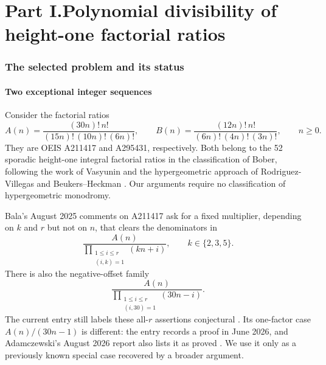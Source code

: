 \documentclass[11pt]{article}
\theoremstyle{definition}
\theoremstyle{remark}
\begin{document}
\begingroup
\small
\setlength{\parskip}{0pt}
\tableofcontents
\endgroup
\newpage

\part*{Part I.\quad Polynomial divisibility of height-one factorial ratios}

\section{The selected problem and its status}
\subsection{Two exceptional integer sequences}
Consider the factorial ratios
\begin{equation}\label{eq:AB}
 A(n)=\frac{(30n)!\,n!}{(15n)!\,(10n)!\,(6n)!},
 \qquad
 B(n)=\frac{(12n)!\,n!}{(6n)!\,(4n)!\,(3n)!},\qquad n\geq0.
\end{equation}
They are OEIS A211417 and A295431, respectively. Both belong to the
52 sporadic height-one integral factorial ratios in the classification
of Bober, following the work of Vasyunin and the hypergeometric approach
of Rodriguez-Villegas and Beukers--Heckman \cite{oeisA,oeisB,bober}.
Our arguments require no classification of hypergeometric monodromy.

Bala's August 2025 comments on A211417 ask for a fixed multiplier,
depending on $k$ and $r$ but not on $n$, that clears the denominators in
\begin{equation}\label{eq:balaPositive}
 \frac{A(n)}{\displaystyle\prod_{\substack{1\leq i\leq r\\(i,k)=1}}(kn+i)},
 \qquad k\in\{2,3,5\}.
\end{equation}
There is also the negative-offset family
\begin{equation}\label{eq:balaNegative}
 \frac{A(n)}{\displaystyle\prod_{\substack{1\leq i\leq r\\(i,30)=1}}(30n-i)}.
\end{equation}
The current entry still labels these all-$r$ assertions conjectural
\cite{oeisA}. Its one-factor case $A(n)/(30n-1)$ is different: the entry
records a proof in June 2026, and Adamczewski's August 2026 report also
lists it as proved \cite{oeisA,adamczewski}. We use it only as a previously
known special case recovered by a broader argument.
\end{document}
